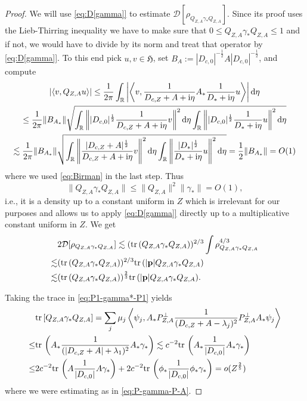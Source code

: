 \documentclass[a4paper]{amsart}
\def\tr{{\rm tr \,}}
\def\R{\mathbb{R}}
\def\bp{{\mathbf p}}
\def\cD{\mathcal{D}}
\def\gH{\mathfrak{H}}
\def\rd{\mathrm{d}}
\def\ri{\mathrm{i}}
\def\rz{\mathbb{R}} %
\begin{document}
\begin{proof}
We will use \eqref{eq:D[gamma]} to estimate
$\cD[\rho_{Q_{Z,A}\gamma_* Q_{Z,A}}]$. Since its proof uses the
Lieb-Thirring inequality we have to make sure that
$0\leq Q_{Z,A}\gamma_* Q_{Z,A}\leq1$ and if not, we would have to
divide by its norm and treat that operator by \eqref{eq:D[gamma]}. To
this end pick $u,v\in \gH$, set
$B_A:=|D_{c,0}|^{-\frac12}A|D_{c,0}|^{-\frac12}$, and compute
\begin{multline}
  \left|\left<v,Q_{Z,A}u\right>\right|
  \leq\frac{1}{2\pi}\int_{\R}\left|\left<v, \frac{1}{D_{c,Z}+A+\ri \eta} A_*  \frac{1}{D_*+\ri \eta} u\right>\right|\rd \eta\\
  \leq \frac{1 }{2\pi}\|B_{A_*}\|
  \sqrt{\int_{\R}\left\||D_{c,0}|^\frac12 {1\over D_{c,Z}+A+\ri \eta}v\right\|^2\rd \eta\int_{\rz}\left\||D_{c,0}|^\frac12  \frac{1}{D_*+\ri \eta} u\right\|^2\rd \eta}\\
  \lesssim \frac{1 }{2\pi}\|B_{A_*}\|
  \sqrt{
    \int_{\R}\left\| {|D_{c,Z}+A|^\frac12\over D_{c,Z}+A+\ri \eta} v\right\|^2\rd \eta
    \int_{\rz}\left\|{|D_*|^\frac12  \over D_*+\ri \eta} u\right\|^2\rd \eta}
  =\frac12 \|B_{A_*}\| =O(1)
\end{multline}
where we used \eqref{eq:Birman} in the last step. Thus
\begin{equation}
    \|Q_{Z,A}\gamma_*Q_{Z,A}\|\leq\|Q_{Z,A}\|^2\|\gamma_*\|=O(1),
  \end{equation}
  i.e., it is a density up to a constant uniform in $Z$ which is
  irrelevant for our purposes and allows us to apply
  \eqref{eq:D[gamma]} directly up to a multiplicative constant uniform
  in $Z$. We get
  \begin{equation}
    \begin{split}
  &2\cD[\rho_{Q_{Z,A}\gamma_*Q_{Z,A}}]\lesssim (\tr (Q_{Z,A}\gamma_*Q_{Z,A}))^{2/3}\int \rho^{4/3}_{ Q_{Z,A}\gamma_* Q_{Z,A}}\\
  \lesssim& (\tr (Q_{Z,A}\gamma_*Q_{Z,A}))^{2/3} \tr (|\bp|Q_{Z,A}\gamma_* Q_{Z,A})\\
  \lesssim& (\tr (Q_{Z,A}\gamma_*Q_{Z,A}))^\frac23  \tr (|\bp|Q_{Z,A}\gamma_* Q_{Z,A}).
    \end{split}
  \end{equation}

Taking the trace in \eqref{eq:P1-gamma*-P1} yields
\begin{equation}\label{eq:3.15}
  \begin{split}
  &\tr[ Q_{Z,A}\gamma_* Q_{Z,A}]=\sum_{j} \mu_j \left<\psi_j, A_* P_{Z,A}^{\perp}\frac{1}{(D_{c,Z}+A-\lambda_j)^2} P_{Z,A}^{\perp} A_* \psi_j\right>\\
  \leq &\tr\left(A_*
    \frac{1}{(|D_{c,Z}+A|+\lambda_1)^2}A_*\gamma_*\right) \lesssim
  c^{-2}\tr\left(A_*{1\over |D_{c,0}|} A_*\gamma_*\right)\\
   \leq &2c^{-2}\tr\left(A{1\over |D_{c,0}|} A\gamma_*\right)+2 c^{-2}\tr\left(\phi_*{1\over |D_{c,0}|} \phi_*\gamma_*\right)=o(Z^\frac25)
  \end{split}
\end{equation}
where we were estimating as in \eqref{eq:P-gamma-P-A}.


\end{proof}
\end{document}
